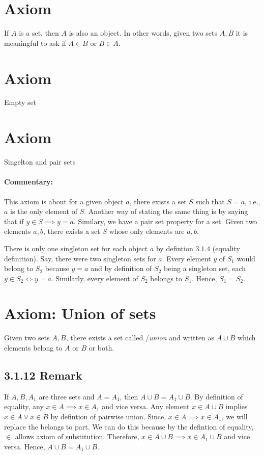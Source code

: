 \documentclass{report}
\begin{document}
\section{Axiom}
If  $A$ is a set, then $A$ is also an object. In other words, given two sets $A,B$ it is meaningful to ask if $A \in B$ or $B \in A$.

\section{Axiom}
Empty set 

\section{Axiom}
Singelton and pair sets
\paragraph{Commentary: } This axiom is about for a given object $a$, there exists a set  $S$ such that  $S={a}$, i.e.,  $a$ is the only element of  $S$. Another way of stating the same thing is by saying that if  $y \in S \implies y = a$. Similary, we have a pair set property for a set. Given two elements  $a,b$, there exists a set  $S$ whose only elements are  $a,b$.

There is only one singleton set for each object $a$ by defintion $3.1.4$ (equality definition). Say, there were two singleton sets for $a$. Every element  $y$ of  $S_1$ would belong to  $S_2$ because  $y=a$ and by definition of  $S_2$ being a singleton set, each  $y \in S_2 \iff y=a$. Similarly,  every element of  $S_2$ belongs to  $S_1$. Hence,  $S_1 = S_2$.  

\section{Axiom: Union of sets}
Given two sets  $A,B$, there exists a set called /\textit{union} and written as  $A \cup B$ which elements belong to  $A$ or  $B$ or both. 

\subsection*{3.1.12 Remark}
If $A,B,A_1$ are three sets and $A=A_1$, then $A \cup B = A_1 \cup B$. By definition of equality, any $x \in A \implies x \in A_1$ and vice versa. Any element  $x \in A \cup B$ implies  $x \in A \lor x \in B$ by defintion of pairwise union. Since,  $x \in A \implies x \in A_1$, we will replace the belongs to part. We can do this because by the defintion of equality, $\in$ allows axiom of substitution. Therefore,  $x \in A \cup B \implies x \in A_1 \cup B$ and vice versa. Hence, $A \cup B = A_1 \cup B$.  
\end{document}

